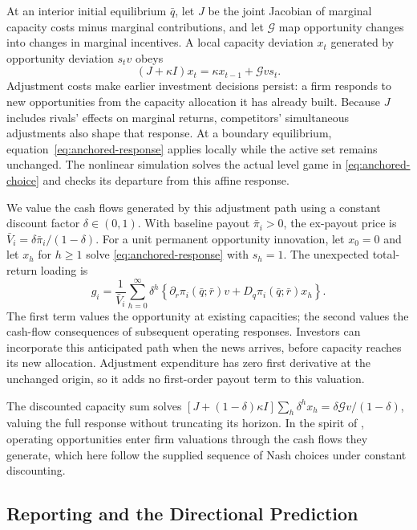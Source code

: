 At an interior initial equilibrium $\bar q$, let $J$ be the joint Jacobian
of marginal capacity costs minus marginal contributions, and let $\mathcal G$
map opportunity changes into changes in marginal incentives.
A local capacity deviation $x_t$ generated by opportunity deviation
$s_t v$ obeys
\begin{equation}\label{eq:anchored-response}
  (J+\kappa I)x_t=\kappa x_{t-1}+\mathcal G v s_t.
\end{equation}
Adjustment costs make earlier investment decisions persist: a firm responds
to new opportunities from the capacity allocation it has already built.
Because $J$ includes rivals' effects on marginal returns, competitors'
simultaneous adjustments also shape that response.
At a boundary equilibrium, equation~\eqref{eq:anchored-response} applies
locally while the active set remains unchanged.
The nonlinear simulation solves the actual level game in
\eqref{eq:anchored-choice} and checks its departure from this affine
response.

We value the cash flows generated by this adjustment path using a constant
discount factor $\delta\in(0,1)$.
With baseline payout $\bar\pi_i>0$, the ex-payout price is
$\bar V_i=\delta\bar\pi_i/(1-\delta)$.
For a unit permanent opportunity innovation, let $x_0=0$ and let $x_h$ for
$h\geq1$ solve \eqref{eq:anchored-response} with $s_h=1$.
The unexpected total-return loading is
\begin{equation}\label{eq:same-path-value}
  g_i=\frac{1}{\bar V_i}\sum_{h=0}^{\infty}\delta^h
  \left\{\partial_r\pi_i(\bar q;\bar r)v+D_q\pi_i(\bar q;\bar r)x_h\right\}.
\end{equation}
The first term values the opportunity at existing capacities; the second
values the cash-flow consequences of subsequent operating responses.
Investors can incorporate this anticipated path when the news arrives,
before capacity reaches its new allocation.
Adjustment expenditure has zero first derivative at the unchanged origin,
so it adds no first-order payout term to this valuation.

The discounted capacity sum solves
$[J+(1-\delta)\kappa I]\sum_h\delta^h x_h
=\delta\mathcal Gv/(1-\delta)$, valuing the full response without truncating
its horizon.
In the spirit of \citet{berk_green_naik_growth_options_1999}, operating
opportunities enter firm valuations through the cash flows they generate,
which here follow the supplied sequence of Nash choices under
constant discounting.

\subsection{Reporting and the Directional Prediction}\label{sec:model-observation}

